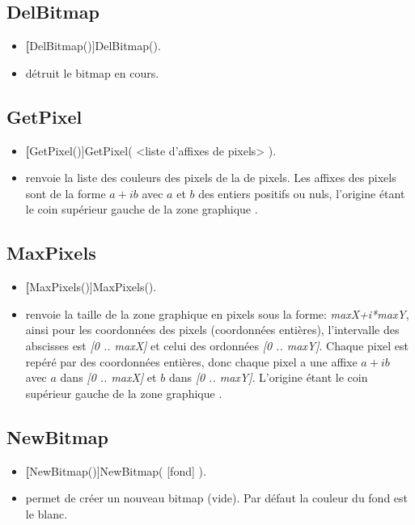 \subsection{DelBitmap}\label{cmdDelBitmap}
\begin{itemize}
 \item \util \textbf[DelBitmap()]{DelBitmap()}.
 \item \desc détruit le bitmap en cours.
\end{itemize}

\subsection{GetPixel}\label{cmdGetPixel}
\begin{itemize}
 \item \util \textbf[GetPixel()]{GetPixel( <liste d'affixes de pixels> )}.
 \item \desc renvoie la liste des couleurs des pixels de la  de pixels. Les affixes des pixels sont de la forme $a+ib$ avec $a$ et $b$ des entiers positifs ou nuls, l'origine étant le coin supérieur gauche de la zone graphique .
\end{itemize}

\subsection{MaxPixels}\label{cmdMaxPixels}
\begin{itemize}
 \item \util \textbf[MaxPixels()]{MaxPixels()}.
 \item \desc renvoie la taille de la zone graphique en pixels sous la forme: \textsl{maxX+i*maxY}, ainsi pour les coordonnées des pixels (coordonnées entières), l'intervalle des abscisses est \textsl{[0 .. maxX]} et celui des ordonnées \textsl{[0 .. maxY]}. Chaque pixel est repéré par des coordonnées entières, donc chaque pixel a une affixe $a+ib$ avec $a$ dans \textsl{[0 .. maxX]} et $b$ dans \textsl{[0 .. maxY]}. L'origine étant le coin supérieur gauche de la zone graphique .
\end{itemize}

\subsection{NewBitmap}\label{cmdNewBitmap}
\begin{itemize}
 \item \util \textbf[NewBitmap()]{NewBitmap( [fond] )}.
 \item \desc permet de créer un nouveau bitmap (vide). Par défaut la couleur du fond est le blanc.
\end{itemize}

